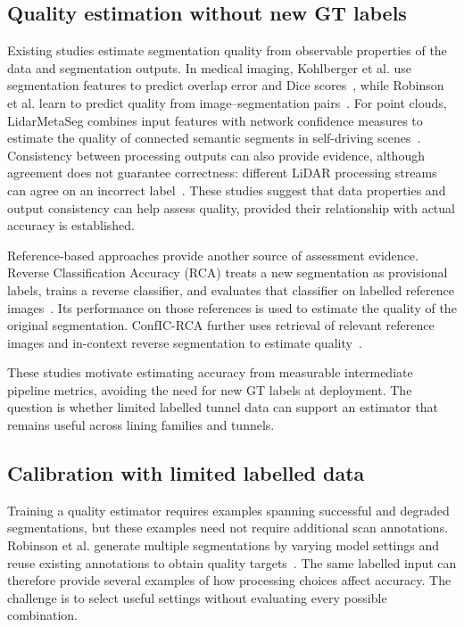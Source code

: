 \documentclass[a4paper,fleqn]{cas-dc}
\begin{document}
\subsection{Quality estimation without new GT labels}

Existing studies estimate segmentation quality from observable properties of the data and segmentation outputs. In medical imaging, Kohlberger et al. use segmentation features to predict overlap error and Dice scores~\cite{kohlberger2012evaluating}, while Robinson et al. learn to predict quality from image--segmentation pairs~\cite{robinson2018segmentationQuality}. For point clouds, LidarMetaSeg combines input features with network confidence measures to estimate the quality of connected semantic segments in self-driving scenes~\cite{colling2021lidarmetaseg}. Consistency between processing outputs can also provide evidence, although agreement does not guarantee correctness: different LiDAR processing streams can agree on an incorrect label~\cite{bogdoll2025labelfree}. These studies suggest that data properties and output consistency can help assess quality, provided their relationship with actual accuracy is established.

Reference-based approaches provide another source of assessment evidence. Reverse Classification Accuracy (RCA) treats a new segmentation as provisional labels, trains a reverse classifier, and evaluates that classifier on labelled reference images~\cite{valindria2017rca}. Its performance on those references is used to estimate the quality of the original segmentation. ConfIC-RCA further uses retrieval of relevant reference images and in-context reverse segmentation to estimate quality~\cite{cosarinsky2026conficrca}.

These studies motivate estimating accuracy from measurable intermediate pipeline metrics, avoiding the need for new GT labels at deployment. The question is whether limited labelled tunnel data can support an estimator that remains useful across lining families and tunnels.

\subsection{Calibration with limited labelled data}

Training a quality estimator requires examples spanning successful and degraded segmentations, but these examples need not require additional scan annotations. Robinson et al. generate multiple segmentations by varying model settings and reuse existing annotations to obtain quality targets~\cite{robinson2018segmentationQuality}. The same labelled input can therefore provide several examples of how processing choices affect accuracy. The challenge is to select useful settings without evaluating every possible combination.
\end{document}
